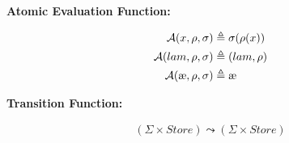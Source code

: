 \documentclass[12pt,draft]{article}
\begin{document}
\vspace{-10mm}
\begin{center}
\textbf{Atomic Evaluation Function:}
\end{center}
\vspace{-7mm}
\begin{align*}
\mathcal{A}(x, \rho, \sigma) &\triangleq \sigma(\rho(x)) \\
\mathcal{A}(lam, \rho, \sigma) &\triangleq (lam , \rho) \\
\mathcal{A}(\mae, \rho, \sigma) &\triangleq \mae
\end{align*}
\vspace{-10mm}
\begin{center}
\textbf{Transition Function:}
\end{center}
\vspace{-7mm}
\begin{align*}
(\Sigma \times \textit{Store}) \leadsto (\Sigma \times \textit{Store})
\end{align*}

\newpage



\end{document}
